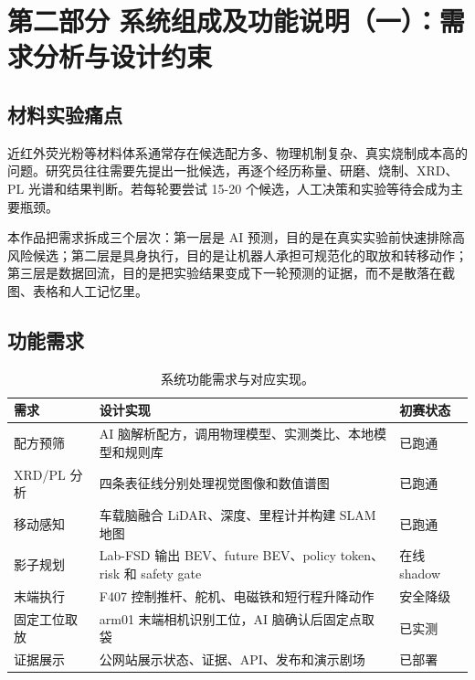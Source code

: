 \section{第二部分 系统组成及功能说明（一）：需求分析与设计约束}

\subsection{材料实验痛点}
近红外荧光粉等材料体系通常存在候选配方多、物理机制复杂、真实烧制成本高的问题。研究员往往需要先提出一批候选，再逐个经历称量、研磨、烧制、XRD、PL 光谱和结果判断。若每轮要尝试 15-20 个候选，人工决策和实验等待会成为主要瓶颈。

本作品把需求拆成三个层次：第一层是 AI 预测，目的是在真实实验前快速排除高风险候选；第二层是具身执行，目的是让机器人承担可规范化的取放和转移动作；第三层是数据回流，目的是把实验结果变成下一轮预测的证据，而不是散落在截图、表格和人工记忆里。

\subsection{功能需求}
\begin{table}[H]
\centering
\caption{系统功能需求与对应实现。}
\begin{tabular}{p{3.5cm}p{5.4cm}p{5.8cm}}
\toprule
需求 & 设计实现 & 初赛状态 \\
\midrule
配方预筛 & AI 脑解析配方，调用物理模型、实测类比、本地模型和规则库 & 已跑通 \\
XRD/PL 分析 & 四条表征线分别处理视觉图像和数值谱图 & 已跑通 \\
移动感知 & 车载脑融合 LiDAR、深度、里程计并构建 SLAM 地图 & 已跑通 \\
影子规划 & Lab-FSD 输出 BEV、future BEV、policy token、risk 和 safety gate & 在线 shadow \\
末端执行 & F407 控制推杆、舵机、电磁铁和短行程升降动作 & 安全降级 \\
固定工位取放 & arm01 末端相机识别工位，AI 脑确认后固定点取袋 & 已实测 \\
证据展示 & 公网站展示状态、证据、API、发布和演示剧场 & 已部署 \\
\bottomrule
\end{tabular}
\end{table}


